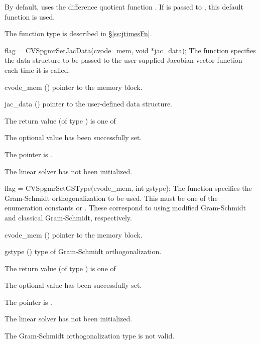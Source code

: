 {
  By default, {\cvspgmr} uses the difference quotient function .
  If  is passed to , this default function is used.

  The function type  is described in \S\ref{ss:jtimesFn}.
}
{
  flag = CVSpgmrSetJacData(cvode\_mem, void *jac\_data);
}
{
  The function  specifies the data structure
  to be passed to the user supplied Jacobian-vector
  function each time it is called.
}
{
  \begin{args}
  \item[cvode\_mem] ()
    pointer to the {\cvode} memory block.
  \item[jac\_data] ()
     pointer to the user-defined data structure.
  \end{args}
}
{
  The return value  (of type ) is one of
  \begin{args}
  \item[\Id{CVSPGMR\_SUCCESS}] 
    The optional value has been successfully set.
  \item[\Id{CVSPGMR\_MEM\_NULL}]
    The  pointer is .
  \item[\Id{CVSPGMR\_LMEM\_NULL}]
    The {\cvspgmr} linear solver has not been initialized.
  \end{args}
}
{}
{
  flag = CVSpgmrSetGSType(cvode\_mem, int gstype);
}
{
  The function  specifies the 
  Gram-Schmidt orthogonalization to be used. 
  This must be one of the enumeration constants 
  or . These correspond to using modified Gram-Schmidt 
  and classical Gram-Schmidt, respectively. 
}
{
  \begin{args}
  \item[cvode\_mem] ()
    pointer to the {\cvode} memory block.
  \item[gstype] ()
    type of Gram-Schmidt orthogonalization.
  \end{args}
}
{
  The return value  (of type ) is one of
  \begin{args}
  \item[\Id{CVSPGMR\_SUCCESS}] 
    The optional value has been successfully set.
  \item[\Id{CVSPGMR\_MEM\_NULL}]
    The  pointer is .
  \item[\Id{CVSPGMR\_LMEM\_NULL}]
    The {\cvspgmr} linear solver has not been initialized.
  \item[\Id{CVSPGMR\_ILL\_INPUT}]
    The Gram-Schmidt orthogonalization type  is not valid.
  \end{args}
}
